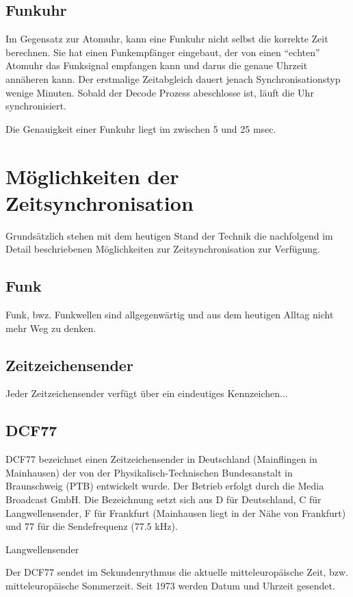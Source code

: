 \subsection{Funkuhr}
Im Gegensatz zur Atomuhr, kann eine Funkuhr nicht selbst die korrekte Zeit berechnen. Sie hat einen Funkempfänger eingebaut, der von einen "`echten"' Atomuhr das Funksignal empfangen kann und darus die genaue Uhrzeit annäheren kann. Der erstmalige Zeitabgleich dauert jenach Synchronisationstyp wenige Minuten. Sobald der Decode Prozess abeschlosse ist, läuft die Uhr synchronisiert.

Die Genauigkeit einer Funkuhr liegt im zwischen 5 und 25 msec.


\section{Möglichkeiten der Zeitsynchronisation}
Grundsätzlich stehen mit dem heutigen Stand der Technik die nachfolgend im Detail beschriebenen Möglichkeiten zur Zeitsynchronisation zur Verfügung.

\subsection{Funk}
Funk, bwz. Funkwellen sind allgegenwärtig und aus dem heutigen Alltag nicht mehr Weg zu denken.

\subsection{Zeitzeichensender}
Jeder Zeitzeichensender verfügt über ein eindeutiges Kennzeichen...

\subsection{DCF77}
DCF77 bezeichnet einen Zeitzeichensender in Deutschland (Mainflingen in Mainhausen) der von der Physikalisch-Technischen Bundesanstalt in Braunschweig (PTB) entwickelt wurde. Der Betrieb erfolgt durch die Media Broadcast GmbH. Die Bezeichnung setzt sich aus D für Deutschland, C für Langwellensender, F für Frankfurt (Mainhausen liegt in der Nähe von Frankfurt) und 77 für die Sendefrequenz (77.5 kHz).

Langwellensender

Der DCF77 sendet im Sekundenrythmus die aktuelle mitteleuropäische Zeit, bzw. mitteleuropäische Sommerzeit. Seit 1973 werden Datum und Uhrzeit gesendet.

